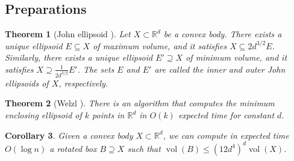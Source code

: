 \documentclass[11pt]{article}
\def\Real{\mathbb{R}}
\let\R\Real
\def\vol{\operatorname{vol}}		%
\newtheorem{theorem}{Theorem}[section]
\newtheorem{corollary}[theorem]{Corollary}
\begin{document}
\subsection{Preparations}
%
\begin{theorem}[John ellipsoid \cite{John48}]
    \label{thm:john-ellipsoid}
    Let $X \subset \R^d$ be a convex body. There exists a unique ellipsoid $E \subseteq X$ of maximum volume, and it satisfies $X \subseteq 2d^{3/2} E$. Similarly, there exists a unique ellipsoid $E' \supseteq X$ of minimum volume, and it satisfies $X \supseteq \frac{1}{2d^{3/2}} E'$. The sets $E$ and $E'$ are called the inner and outer \emph{John ellipsoids} of $X$, respectively.
\end{theorem}
%
\begin{theorem}[Welzl \cite{Welzl05}]
    \label{thm:min-ellipsoid}
    There is an algorithm that computes the minimum enclosing ellipsoid of $k$ points in $\R^d$ in $O(k)$ expected time for constant $d$.
\end{theorem}
%
\begin{corollary}
    \label{cor:bounding-box}
    Given a convex body $X \subset \R^d$, we can compute in expected time $O(\log n)$ a rotated box $B \supseteq X$ such that $\vol(B) \leq (12d^4)^d \vol(X)$.
\end{corollary}
%
\end{document}
